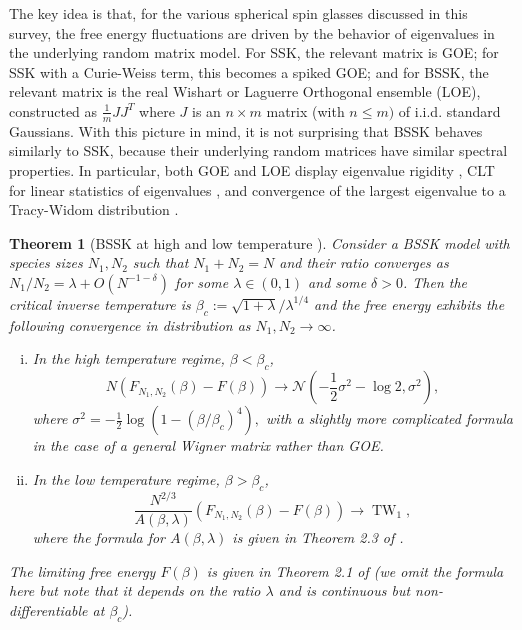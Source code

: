 \documentclass[11pt]{article}
\numberwithin{equation}{section}
\newcommand{\beq}{ \begin{equation} }
\newcommand{\eeq}{ \end{equation} }
\def \b {\beta}
\def \d {\delta}
\def \la {\lambda}
\def \s {\sigma}
\def \cN {\mathcal{N}}
\newtheorem{theorem}{Theorem}[section]
\theoremstyle{remark}
\DeclareMathOperator{\TW}{TW}
\begin{document}
The key idea is that, for the various spherical spin glasses discussed in this survey, the free energy fluctuations are driven by the behavior of eigenvalues in the underlying random matrix model.  For SSK, the relevant matrix is GOE; for SSK with a Curie-Weiss term, this becomes a spiked GOE; and for BSSK, the relevant matrix is the real Wishart or Laguerre Orthogonal ensemble (LOE), constructed as $\frac1m JJ^T$ where $J$ is an $n\times m$ matrix (with $n\leq m)$ of i.i.d. standard Gaussians. 
With this picture in mind, it is not surprising that BSSK behaves similarly to SSK, because their underlying random matrices have similar spectral properties.  In particular, both GOE and LOE display eigenvalue rigidity \cite{ErdosYauYin,PillaiYin}, CLT for linear statistics of eigenvalues \cite{Johansson98,BaiSilverstein04}, and convergence of the largest eigenvalue to a Tracy-Widom distribution \cite{soshnikov1999universality,Soshnikov2002samplecov}.

\begin{theorem}[BSSK at high and low temperature \cite{BL20}]\label{thm:BSSK_highlowtemp} Consider a BSSK model with species sizes $N_1,N_2$ such that $N_1+N_2=N$ and their ratio converges as $N_1/N_2=\la+O(N^{-1-\delta})$ for some $\lambda\in(0,1)$ and some $\d>0$. Then the critical inverse temperature is $\b_c:=\sqrt{1+\la}/\la^{1/4}$ and the free energy exhibits the following convergence in distribution as $N_1,N_2\to\infty$.
\begin{enumerate}[(i)]
\item In the high temperature regime, $\b<\b_c$,
\beq
N(F_{N_1,N_2}(\b)-F(\b))\to\cN(-\frac12\s^2-\log2,\s^2),
\eeq
where $\s^2=-\frac12\log(1-(\b/\b_c)^4),$ with a slightly more complicated formula in the case of a general Wigner matrix rather than GOE.
\item In the low temperature regime, $\b>\b_c$,
\beq
\frac{N^{2/3}}{A(\b,\la)}(F_{N_1,N_2}(\b)-F(\b))\to\TW_1,
\eeq
where the formula for $A(\b,\lambda)$ is given in Theorem 2.3 of \cite{BL20}.
\end{enumerate}
The limiting free energy $F(\b)$ is given in Theorem 2.1 of \cite{BL20} (we omit the formula here but note that it depends on the ratio $\lambda$ %
and is continuous but non-differentiable at $\b_c$).
\end{theorem}
\end{document}
